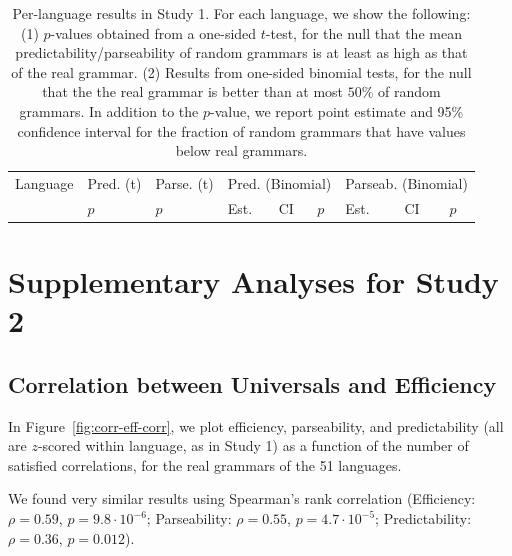\documentclass[10pt,twoside,lineno]{article}
\begin{document}
\begin{table}
\centering
\small{
\begin{tabular}{l||ll|lll|lll}
Language & Pred. (t) & Parse. (t) & \multicolumn{3}{|c|}{Pred. (Binomial)} & \multicolumn{3}{|c|}{Parseab. (Binomial)} \\ 
&  $p$ & $p$ &  Est. &CI & $p$ & Est. & CI & $p$  \\ \hline \hline

\end{tabular}
}
\caption{Per-language results in Study 1. For each language, we show the following: (1) $p$-values obtained from a one-sided $t$-test, for the null that the mean predictability/parseability of random grammars is at least as high as that of the real grammar. (2) Results from one-sided binomial tests, for the null that the the real grammar is better than at most $50 \%$ of random grammars. In addition to the $p$-value, we report point estimate and 95\% confidence interval for the fraction of random grammars that have values below real grammars.}\label{fig:pareto-per-lang-stats}
\end{table}



\section{Supplementary Analyses for Study 2}
\subsection{Correlation between Universals and Efficiency}

In Figure~\ref{fig:corr-eff-corr}, we plot efficiency, parseability, and predictability (all are $z$-scored within language, as in Study 1) as a function of the number of satisfied correlations, for the real grammars of the 51 languages.

We found very similar results using Spearman's rank correlation (Efficiency: $\rho=0.59$, $p = 9.8 \cdot 10^{-6}$; Parseability: $\rho=0.55$, $p=4.7 \cdot 10^{-5}$; Predictability: $\rho=0.36$, $p=0.012$).
\end{document}

